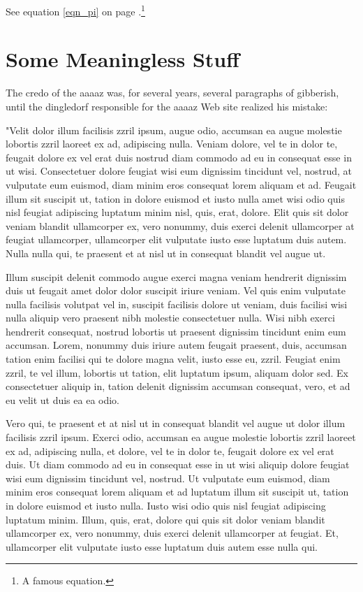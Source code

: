 \documentclass[letterpaper,12pt,titlepage,oneside,final]{book}
\begin{document}
See equation \ref{eqn_pi} on page \pageref{eqn_pi}.\footnote{A famous equation.}

\section{Some Meaningless Stuff}

The credo of the \gls{aaaaz} was, for several years, several paragraphs of gibberish, until the \gls{dingledorf} responsible for the \gls{aaaaz} Web site realized his mistake:

"Velit dolor illum facilisis zzril ipsum, augue odio, accumsan ea augue molestie lobortis zzril laoreet ex ad, adipiscing nulla. Veniam dolore, vel te in dolor te, feugait dolore ex vel erat duis nostrud diam commodo ad eu in consequat esse in ut wisi. Consectetuer dolore feugiat wisi eum dignissim tincidunt vel, nostrud, at vulputate eum euismod, diam minim eros consequat lorem aliquam et ad. Feugait illum sit suscipit ut, tation in dolore euismod et iusto nulla amet wisi odio quis nisl feugiat adipiscing luptatum minim nisl, quis, erat, dolore. Elit quis sit dolor veniam blandit ullamcorper ex, vero nonummy, duis exerci delenit ullamcorper at feugiat ullamcorper, ullamcorper elit vulputate iusto esse luptatum duis autem. Nulla nulla qui, te praesent et at nisl ut in consequat blandit vel augue ut.

Illum suscipit delenit commodo augue exerci magna veniam hendrerit dignissim duis ut feugait amet dolor dolor suscipit iriure veniam. Vel quis enim vulputate nulla facilisis volutpat vel in, suscipit facilisis dolore ut veniam, duis facilisi wisi nulla aliquip vero praesent nibh molestie consectetuer nulla. Wisi nibh exerci hendrerit consequat, nostrud lobortis ut praesent dignissim tincidunt enim eum accumsan. Lorem, nonummy duis iriure autem feugait praesent, duis, accumsan tation enim facilisi qui te dolore magna velit, iusto esse eu, zzril. Feugiat enim zzril, te vel illum, lobortis ut tation, elit luptatum ipsum, aliquam dolor sed. Ex consectetuer aliquip in, tation delenit dignissim accumsan consequat, vero, et ad eu velit ut duis ea ea odio.

Vero qui, te praesent et at nisl ut in consequat blandit vel augue ut dolor illum facilisis zzril ipsum. Exerci odio, accumsan ea augue molestie lobortis zzril laoreet ex ad, adipiscing nulla, et dolore, vel te in dolor te, feugait dolore ex vel erat duis. Ut diam commodo ad eu in consequat esse in ut wisi aliquip dolore feugiat wisi eum dignissim tincidunt vel, nostrud. Ut vulputate eum euismod, diam minim eros consequat lorem aliquam et ad luptatum illum sit suscipit ut, tation in dolore euismod et iusto nulla. Iusto wisi odio quis nisl feugiat adipiscing luptatum minim. Illum, quis, erat, dolore qui quis sit dolor veniam blandit ullamcorper ex, vero nonummy, duis exerci delenit ullamcorper at feugiat. Et, ullamcorper elit vulputate iusto esse luptatum duis autem esse nulla qui.
\end{document}
